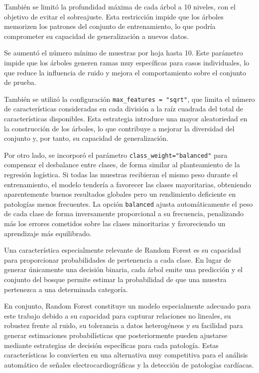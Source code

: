 \documentclass[12pt,a4paper,twoside]{book}
\begin{document}
También se limitó la profundidad máxima de cada árbol a 10 niveles, con el objetivo de evitar el sobreajuste.
Esta restricción impide que los árboles memorizen los patrones del conjunto de entrenamiento, lo que podría comprometer su capacidad de generalización a nuevos datos.

Se aumentó el número mínimo de muestras por hoja hasta 10.
Este parámetro impide que los árboles generen ramas muy específicas para casos individuales, lo que reduce la influencia de ruido y mejora el comportamiento sobre el conjunto de prueba.

También se utilizó la configuración \texttt{max\_features = "sqrt"}, que limita el número de características consideradas en cada división a la raíz cuadrada del total de características disponibles.
Esta estrategia introduce una mayor aleatoriedad en la construcción de los árboles, lo que contribuye a mejorar la diversidad del conjunto y, por tanto, su capacidad de generalización.

Por otro lado, se incorporó el parámetro \texttt{class\_weight="balanced"} para compensar el desbalance entre clases, de forma similar al planteamiento de la regresión logística.
Si todas las muestras recibieran el mismo peso durante el entrenamiento, el modelo tendería a favorecer las clases mayoritarias, obteniendo aparentemente buenos resultados globales pero un rendimiento deficiente en patologías menos frecuentes. 
La opción \texttt{balanced} ajusta automáticamente el peso de cada clase de forma inversamente proporcional a su frecuencia, penalizando más los errores cometidos sobre las clases minoritarias y favoreciendo un aprendizaje más equilibrado.

Una característica especialmente relevante de Random Forest es su capacidad para proporcionar probabilidades de pertenencia a cada clase. 
En lugar de generar únicamente una decisión binaria, cada árbol emite una predicción y el conjunto del bosque permite estimar la probabilidad de que una muestra pertenezca a una determinada categoría.

En conjunto, Random Forest constituye un modelo especialmente adecuado para este trabajo debido a su capacidad para capturar relaciones no lineales, su robustez frente al ruido, su tolerancia a datos heterogéneos y su facilidad para generar estimaciones probabilísticas que posteriormente pueden ajustarse mediante estrategias de decisión específicas para cada patología. 
Estas características lo convierten en una alternativa muy competitiva para el análisis automático de señales electrocardiográficas y la detección de patologías cardíacas.
\end{document}
